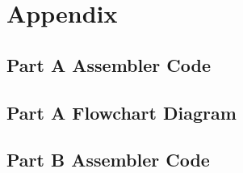 \documentclass[letterpaper]{article}
\begin{document}
\newpage
\section{Appendix}
  \subsection{Part A Assembler Code}
    
\newpage
  \subsection{Part A Flowchart Diagram}
    \vspace{2cm}
    \noindent{}
\newpage
  \subsection{Part B Assembler Code}
    
\newpage
\end{document}
